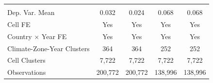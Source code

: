 {\begin{tabular}{l*{4}{c}}
\midrule
\\ Dep. Var. Mean   &       0.032         &       0.024         &       0.068         &       0.068         \\
Cell FE             &         Yes         &         Yes         &         Yes         &         Yes         \\
Country $\times$ Year FE&         Yes         &         Yes         &         Yes         &         Yes         \\
Climate-Zone-Year Clusters&         364         &         364         &         252         &         252         \\
Cell Clusters       &       7,722         &       7,722         &       7,722         &       7,722         \\
Observations        &     200,772         &     200,772         &     138,996         &     138,996         \\
\bottomrule
\end{tabular}
}
